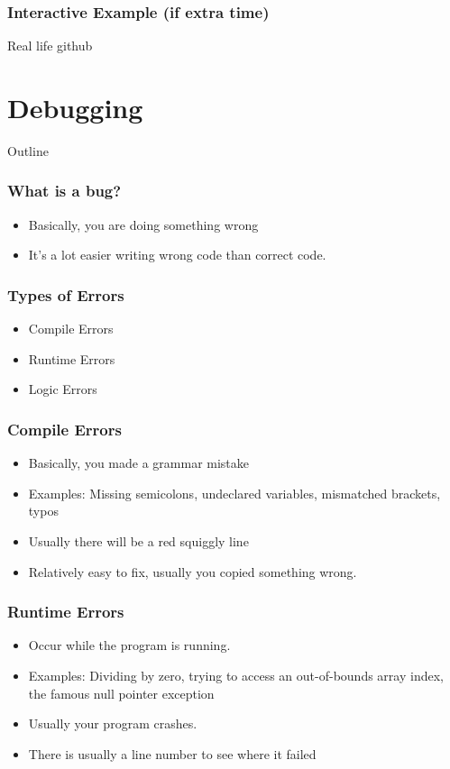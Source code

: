\documentclass[aspectratio=169,hyperref={unicode}]{beamer}
\begin{document}
\begin{frame}
\frametitle{Interactive Example (if extra time)}
Real life github
\end{frame}


\section{Debugging}
\begin{frame}{Outline}
\tableofcontents[currentsection]
\end{frame}

\begin{frame}
\frametitle{What is a bug?}
\begin{itemize}
        \item Basically, you are doing something wrong
\item It's a lot easier writing wrong code than correct code.
\end{itemize}
\end{frame}

\begin{frame}
\frametitle{Types of Errors}
\begin{itemize}
\item Compile Errors
\item Runtime Errors
\item Logic Errors
\end{itemize}
\end{frame}

\begin{frame}
\frametitle{Compile Errors}
\begin{itemize}
\item Basically, you made a grammar mistake
\item Examples: Missing semicolons, undeclared variables, mismatched brackets, typos


  \item Usually there will be a red squiggly line
        \item Relatively easy to fix, usually you copied something wrong.
\end{itemize}
\end{frame}

\begin{frame}
\frametitle{Runtime Errors}
\begin{itemize}
\item Occur while the program is running.
\item Examples: Dividing by zero, trying to access an out-of-bounds array index, the famous null pointer exception
\item Usually your program crashes.
\item There is usually a line number to see where it failed
\end{itemize}
\end{frame}
\end{document}
